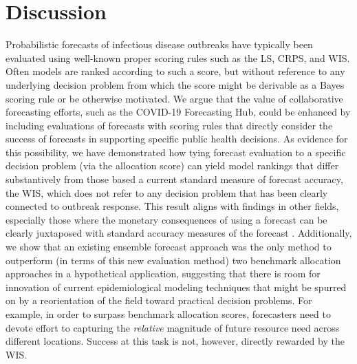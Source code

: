\documentclass{article}\usepackage[]{graphicx}\usepackage[]{xcolor}
\begin{document}
\section{Discussion}
\label{sec:discussion}

Probabilistic forecasts of infectious disease outbreaks have typically been evaluated using well-known proper scoring
rules such as the LS, CRPS, and WIS. Often models are ranked according to such a score, but without reference to any
underlying decision problem from which the score might be derivable as a Bayes scoring rule or be otherwise motivated.
We argue that the value of collaborative forecasting efforts, such as the COVID-19 Forecasting Hub, could be enhanced by
including evaluations of forecasts with
scoring rules that directly consider the success of forecasts in supporting specific public health decisions. As evidence for this
possibility, we have demonstrated how tying forecast evaluation to a specific decision problem (via the allocation
score) can yield model rankings that differ substantively from those based a current standard measure of forecast
accuracy, the WIS, which does not refer to any decision problem that has been clearly connected to outbreak response.
This result aligns with findings in other fields, especially those where the monetary consequences of using a forecast
can be clearly juxtaposed with standard accuracy measures of the forecast \citep{leitch1991economicForecastEval,
murphy1993whatisagoodforecast, cenesizoglu2012returnPredictionEconValue}. Additionally, we show that an existing
ensemble forecast approach was the only method to outperform (in terms of this new evaluation method) two benchmark
allocation approaches in a hypothetical application, suggesting that there is room for innovation of current
epidemiological modeling techniques that might be spurred on by a reorientation of the field toward practical decision
problems. For example, in order to surpass benchmark allocation scores, forecasters need to devote effort to capturing
the \emph{relative} magnitude of future resource need across different locations.  Success at this task is not, however,
directly rewarded by the WIS. 
\end{document}
